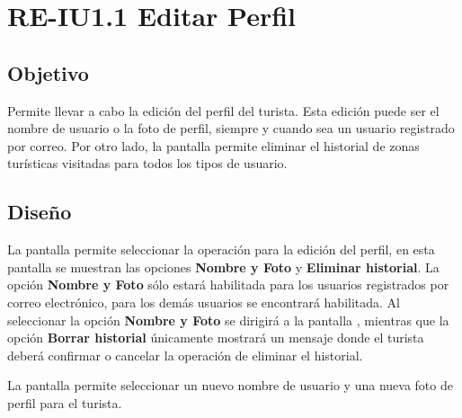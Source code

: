 \newpage
\section{RE-IU1.1 Editar Perfil}

\subsection{Objetivo}
Permite llevar a cabo la edición del perfil del turista. Esta edición puede ser el nombre de usuario o la foto de perfil, siempre y cuando sea un usuario registrado por correo. Por otro lado, la pantalla permite eliminar el historial de zonas turísticas visitadas para todos los tipos de usuario.

\subsection{Diseño}
La pantalla  permite seleccionar la operación para la edición del perfil, en esta pantalla se muestran las opciones \textbf{Nombre y Foto} y \textbf{Eliminar historial}. La opción \textbf{Nombre y Foto} sólo estará habilitada para los usuarios registrados por correo electrónico, para los demás usuarios se encontrará habilitada. Al seleccionar la opción \textbf{Nombre y Foto} se dirigirá a la pantalla 
, mientras que la opción \textbf{Borrar historial} únicamente mostrará un mensaje donde el turista deberá confirmar o cancelar la operación de eliminar el historial.


La pantalla  permite seleccionar un nuevo nombre de usuario y una nueva foto de perfil para el turista.




